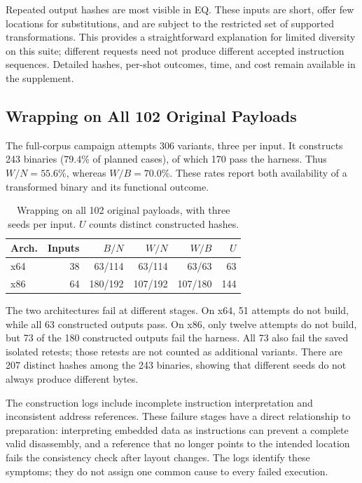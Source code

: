 Repeated output hashes are most visible in EQ. These inputs are short,
offer few locations for substitutions, and are subject to the restricted
set of supported transformations. This provides a straightforward
explanation for limited diversity on this suite; different requests need
not produce different accepted instruction sequences. Detailed hashes,
per-shot outcomes, time, and cost remain available in the supplement.

\subsection{Wrapping on All 102 Original Payloads}
The full-corpus campaign attempts 306 variants, three per input. It constructs
243 binaries (79.4\% of planned cases), of which 170 pass the harness.
Thus $W/N=55.6$\%, whereas $W/B=70.0$\%. These rates report both availability of a transformed binary and
its functional outcome.


\begin{table}[t]
\caption{Wrapping on all 102 original payloads, with three seeds per input.
$U$ counts distinct constructed hashes.}
\label{tab:new_wrap_full}
\centering\small
\begin{tabular}{@{}lrrrrr@{}}
\toprule
Arch. & Inputs & $B/N$ & $W/N$ & $W/B$ & $U$ \\
\midrule
x64 & 38 & 63/114 & 63/114 & 63/63 & 63 \\
x86 & 64 & 180/192 & 107/192 & 107/180 & 144 \\
\bottomrule
\end{tabular}
\end{table}


The two architectures fail at different stages. On x64, 51 attempts do
not build, while all 63 constructed outputs pass. On x86, only twelve
attempts do not build, but 73 of the 180 constructed outputs fail the
harness. All 73 also fail the saved isolated retests; those retests are
not counted as additional variants. There are 207 distinct hashes among
the 243 binaries, showing that different seeds do not always produce
different bytes.

The construction logs include incomplete instruction interpretation and
inconsistent address references. These failure stages have a direct
relationship to preparation: interpreting embedded data as instructions
can prevent a complete valid disassembly, and a reference that no longer
points to the intended location fails the consistency check after layout
changes. The logs identify these symptoms; they do not assign one common
cause to every failed execution.

